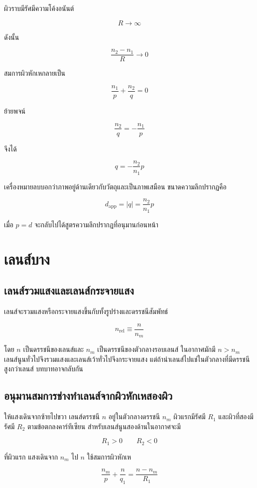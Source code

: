 ผิวราบมีรัศมีความโค้งอนันต์

\[
R\to\infty
\]

ดังนั้น

\[
\frac{n_2-n_1}{R}\to0
\]

สมการผิวหักเหกลายเป็น

\[
\frac{n_1}{p}+\frac{n_2}{q}=0
\]

ย้ายพจน์

\[
\frac{n_2}{q}=-\frac{n_1}{p}
\]

จึงได้

\[
q=-\frac{n_2}{n_1}p
\]

เครื่องหมายลบบอกว่าภาพอยู่ด้านเดียวกับวัตถุและเป็นภาพเสมือน ขนาดความลึกปรากฏคือ

\[
d_{\text{app}}=|q|=\frac{n_2}{n_1}p
\]

เมื่อ $p=d$ จะกลับไปได้สูตรความลึกปรากฏที่อนุมานก่อนหน้า

\section{เลนส์บาง}

\subsection{เลนส์รวมแสงและเลนส์กระจายแสง}

เลนส์จะรวมแสงหรือกระจายแสงขึ้นกับทั้งรูปร่างและดรรชนีสัมพัทธ์

\[
n_{\text{rel}}\equiv\frac{n}{n_m}
\]

โดย $n$ เป็นดรรชนีของเลนส์และ $n_m$ เป็นดรรชนีของตัวกลางรอบเลนส์ ในอากาศมักมี $n>n_m$ เลนส์นูนทั่วไปจึงรวมแสงและเลนส์เว้าทั่วไปจึงกระจายแสง แต่ถ้านำเลนส์ไปแช่ในตัวกลางที่มีดรรชนีสูงกว่าเลนส์ บทบาทอาจกลับกัน

\subsection{อนุมานสมการช่างทำเลนส์จากผิวหักเหสองผิว}

ให้แสงเดินจากซ้ายไปขวา เลนส์ดรรชนี $n$ อยู่ในตัวกลางดรรชนี $n_m$ ผิวแรกมีรัศมี $R_1$ และผิวที่สองมีรัศมี $R_2$ ตามข้อตกลงคาร์ทีเซียน สำหรับเลนส์นูนสองด้านในอากาศจะมี

\[
R_1>0
\qquad
R_2<0
\]

ที่ผิวแรก แสงเดินจาก $n_m$ ไป $n$ ใช้สมการผิวหักเห

\[
\frac{n_m}{p}
+
\frac{n}{q_1}
=
\frac{n-n_m}{R_1}
\tag{1}
\]

